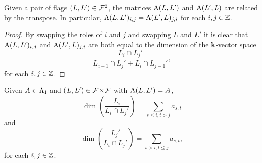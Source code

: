 \documentclass[a4paper, 11pt]{report}
\begin{document}
\begin{lemma}\label{lemma:transpose-orbit}
Given a pair of flags $(L,L')\in\mathcal{F}^2$, the matrices $\operatorname{A}(L,L')$ and $\operatorname{A}(L',L)$ are related by the transpose. In particular, $\operatorname{A}(L,L')_{i,j} = \operatorname{A}(L',L)_{j,i}$ for each $i,j\in\mathbb{Z}$.
\end{lemma}

\begin{proof}
By swapping the roles of $i$ and $j$ and swapping $L$ and $L'$ it is clear that $\operatorname{A}(L,L')_{i,j}$ and $\operatorname{A}(L',L)_{j,i}$ are both equal to the dimension of the $\mathbf{k}$-vector space
\begin{equation*}
\frac{L_i\cap L_j'}{L_{i-1}\cap L_j' + L_i\cap L_{j-1}'},
\end{equation*}
for each $i,j\in\mathbb{Z}$.
\end{proof}

\begin{lemma}\label{lemma:hook-codimension-formula}
Given $A\in\Lambda_1{}$ and $(L,L')\in{\mathcal{F}\!\times\!\mathcal{F}}$ with $\operatorname{A}(L,L')=A$,
\begin{equation*}
\dim\left(\frac{L_i}{L_i\cap L_j'}\right) = \sum_{s\le i, t>j} a_{s,t}
\end{equation*}
and
\begin{equation*}
\dim\left(\frac{L_j'}{L_i\cap L_j'}\right) = \sum_{s>i,t\le j}a_{s,t},
\end{equation*}
for each $i,j\in\mathbb{Z}$.
\end{lemma}
\end{document}
